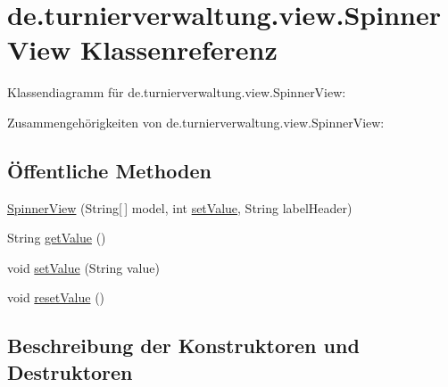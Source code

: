 \hypertarget{classde_1_1turnierverwaltung_1_1view_1_1_spinner_view}{}\section{de.\+turnierverwaltung.\+view.\+Spinner\+View Klassenreferenz}
\label{classde_1_1turnierverwaltung_1_1view_1_1_spinner_view}


Klassendiagramm für de.\+turnierverwaltung.\+view.\+Spinner\+View\+:


Zusammengehörigkeiten von de.\+turnierverwaltung.\+view.\+Spinner\+View\+:
\subsection*{Öffentliche Methoden}
\begin{DoxyCompactItemize}
\item 
\hyperlink{classde_1_1turnierverwaltung_1_1view_1_1_spinner_view_aad423d9c9896b6e4440138fe03cec75c}{Spinner\+View} (String\mbox{[}$\,$\mbox{]} model, int \hyperlink{classde_1_1turnierverwaltung_1_1view_1_1_spinner_view_a7c0764f3f950f114afe1bed24cad71cf}{set\+Value}, String label\+Header)
\item 
String \hyperlink{classde_1_1turnierverwaltung_1_1view_1_1_spinner_view_af08a56602885a675c23f01f49119bc2f}{get\+Value} ()
\item 
void \hyperlink{classde_1_1turnierverwaltung_1_1view_1_1_spinner_view_a7c0764f3f950f114afe1bed24cad71cf}{set\+Value} (String value)
\item 
void \hyperlink{classde_1_1turnierverwaltung_1_1view_1_1_spinner_view_a7cb42152a7f741e23118cf6b32f4078e}{reset\+Value} ()
\end{DoxyCompactItemize}


\subsection{Beschreibung der Konstruktoren und Destruktoren}
